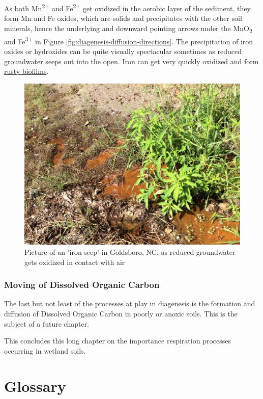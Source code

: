 \documentclass[]{book}
\theoremstyle{definition}
\theoremstyle{definition}
\theoremstyle{definition}
\theoremstyle{remark}
\begin{document}
As both Mn\textsuperscript{2+} and Fe\textsuperscript{2+} get oxidized
in the aerobic layer of the sediment, they form Mn and Fe oxides, which
are solids and precipitates with the other soil minerals, hence the
underlying and downward pointing arrows under the MnO\textsubscript{2}
and Fe\textsuperscript{3+} in Figure
\ref{fig:diagenesis-diffusion-directions}. The precipitation of iron
oxides or hydroxides can be quite visually spectacular sometimes as
reduced groundwater seeps out into the open. Iron can get very quickly
oxidized and form
\href{https://photos.app.goo.gl/NUPx5DjU1QdZC09q1}{rusty biofilms}.

\begin{figure}

{\centering \includegraphics[width=0.75\linewidth]{pictures/Fe-seep-claridge} 

}

\caption{Picture of an 'iron seep' in Goldsboro, NC, as reduced groundwater gets oxidized in contact with air}\label{fig:Fe-seep-CL}
\end{figure}

\subsection{Moving of Dissolved Organic
Carbon}\label{moving-of-dissolved-organic-carbon}

The last but not least of the processes at play in diagenesis is the
formation and diffusion of Dissolved Organic Carbon in poorly or anoxic
soils. This is the subject of a future chapter.

This concludes this long chapter on the importance respiration processes
occurring in wetland soils.

\hypertarget{glossary}{\chapter{Glossary}\label{glossary}}
\end{document}
